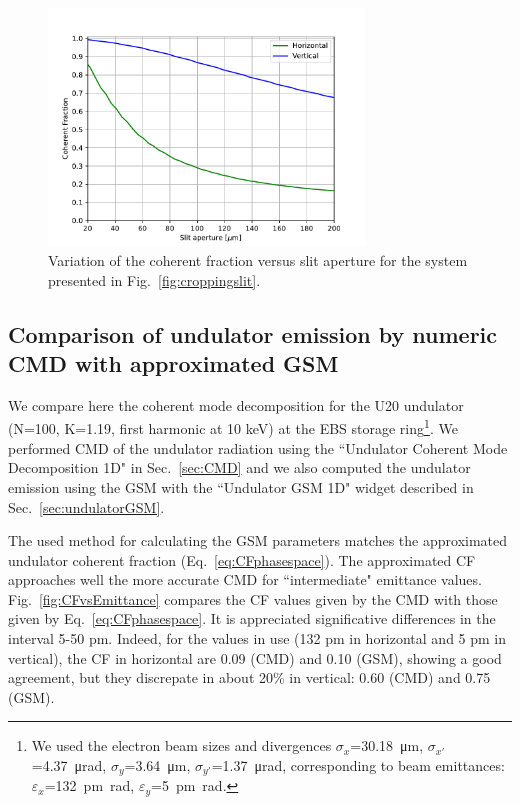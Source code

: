 \documentclass{iopconfser}
\begin{document}
\begin{figure}
    \centering
    \includegraphics[width=0.75\textwidth]{figures/CFvsGap.pdf}
    \caption{Variation of the coherent fraction versus slit aperture for the system presented in Fig.~\ref{fig:croppingslit}.   }\label{fig:slitscan}
\end{figure}

\subsection{Comparison of undulator emission by numeric CMD with approximated GSM}\label{sec:CMDvsGSM}
We compare here the coherent mode decomposition for the U20 undulator (N=100, K=1.19, first harmonic at 10 keV) at the EBS storage ring\footnote{We used the electron beam sizes and divergences 
$\sigma_x$=\SI{30.18}{\micro\meter},
$\sigma_{x'}$=\SI{4.37}{\micro\radian},
$\sigma_y$=\SI{3.64}{\micro\meter},
$\sigma_{y'}$=\SI{1.37}{\micro\radian},
corresponding to beam emittances:  $\varepsilon_x$=\SI{132}{\pico\meter \radian},
$\varepsilon_y$=\SI{5}{\pico\meter \radian}.
}.
We performed CMD of the undulator radiation using the ``Undulator Coherent Mode Decomposition 1D" in Sec.~\ref{sec:CMD} and we also computed the undulator emission using the GSM with the ``Undulator GSM 1D" widget described in Sec.~\ref{sec:undulatorGSM}. 

The used method for calculating the GSM parameters matches the approximated undulator coherent fraction (Eq.~\ref{eq:CFphasespace}). The approximated CF approaches well the more accurate CMD for ``intermediate" emittance values. Fig.~\ref{fig:CFvsEmittance} compares the CF values given by the CMD with those given by Eq.~\ref{eq:CFphasespace}. It  is appreciated significative differences in the interval 5-50 pm. Indeed, for the values in use (132 pm in horizontal and 5 pm in vertical), the CF in horizontal are 0.09 (CMD) and 0.10 (GSM), showing a good agreement, but they discrepate in about 20\% in vertical: 0.60 (CMD) and 0.75 (GSM). 
\end{document}
